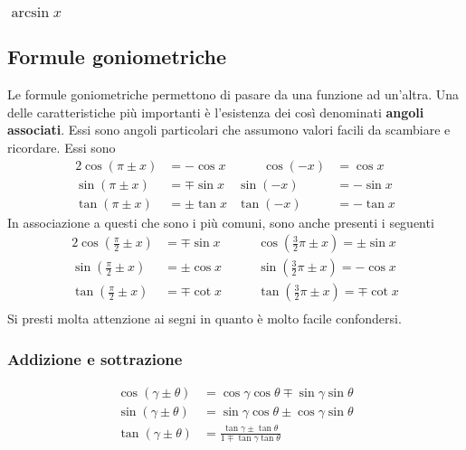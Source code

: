 \subsubsection{$\arcsin x$}
\begin{center}
\end{center}

\subsection{Formule goniometriche}
Le formule goniometriche permettono di pasare da una funzione ad un'altra. Una delle caratteristiche 
più importanti è l'esistenza dei così denominati \textbf{angoli associati}. Essi sono angoli 
particolari che assumono valori facili da scambiare e ricordare. Essi sono
\begin{alignat*}{2}
\cos(\pi\pm x) & = -\cos x &\qquad \cos(-x) &= \cos x\\
\sin(\pi\pm x) &= \mp\sin x & \sin(-x) &= -\sin x\\
\tan(\pi\pm x) &= \pm\tan x & \tan(-x) &= -\tan x
\end{alignat*}
In associazione a questi che sono i più comuni, sono anche presenti i seguenti
\begin{alignat*}{2}
\cos\left(\frac{\pi}{2}\pm x\right) &= \mp\sin x &\qquad \cos\left(\frac{3}{2}\pi\pm x\right) = 
\pm\sin x\\
\sin\left(\frac{\pi}{2}\pm x\right) &= \pm\cos x &\qquad \sin\left(\frac{3}{2}\pi\pm x\right) = 
-\cos x\\
\tan\left(\frac{\pi}{2}\pm x\right) &= \mp\cot x &\qquad \tan\left(\frac{3}{2}\pi\pm x\right) = 
\mp\cot x\\
\end{alignat*}
Si presti molta attenzione ai segni in quanto è molto facile confondersi.

\subsubsection{Addizione e sottrazione}
\begin{align*}
\cos(\gamma\pm\theta) &= \cos\gamma\cos\theta\mp\sin\gamma\sin\theta\\
\sin(\gamma\pm\theta) &= \sin\gamma\cos\theta\pm\cos\gamma\sin\theta\\
\tan(\gamma\pm\theta) &= \frac{\tan\gamma\pm\tan\theta}{1\mp\tan\gamma\tan\theta}
\end{align*}

